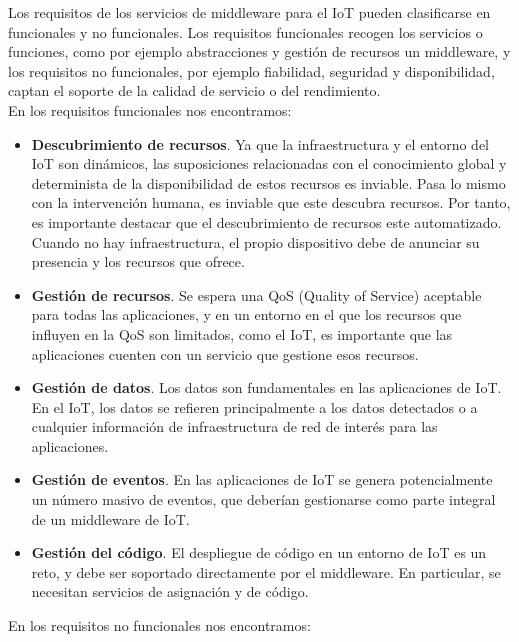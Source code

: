 { Los requisitos de los servicios de middleware para el IoT pueden clasificarse en funcionales y no funcionales. Los requisitos funcionales recogen los servicios o funciones, como por ejemplo abstracciones y gestión de recursos un middleware, y los requisitos no funcionales, por ejemplo fiabilidad, seguridad y disponibilidad, captan el soporte de la calidad de servicio o del rendimiento.\\
 
 En los requisitos funcionales nos encontramos:
 
 \begin{itemize}
     \item \textbf{Descubrimiento de recursos}. Ya que la infraestructura y el entorno del IoT son dinámicos, las suposiciones relacionadas con el conocimiento global y determinista de la disponibilidad de estos recursos es inviable. Pasa lo mismo con la intervención humana, es inviable que este descubra recursos. Por tanto, es importante destacar que el descubrimiento de recursos este automatizado. Cuando no hay infraestructura, el propio dispositivo debe de anunciar su presencia y los recursos que ofrece.
     \item \textbf{Gestión de recursos}. Se espera una QoS (Quality of Service) aceptable para todas las aplicaciones, y en un entorno en el que los recursos que influyen en la QoS son limitados, como el IoT, es importante que las aplicaciones cuenten con un servicio que gestione esos recursos.
     \item \textbf{Gestión de datos}. Los datos son fundamentales en las aplicaciones de IoT. En el IoT, los datos se refieren principalmente a los datos detectados o a cualquier información de infraestructura de red de interés para las aplicaciones.
     \item \textbf{Gestión de eventos}. En las aplicaciones de IoT se genera potencialmente un número masivo de eventos, que deberían gestionarse como parte integral de un middleware de IoT.
     \item \textbf{Gestión del código}. El despliegue de código en un entorno de IoT es un reto, y debe ser soportado directamente por el middleware. En particular, se necesitan servicios de asignación y de código.
 \end{itemize}
 
 En los requisitos no funcionales nos encontramos:
 
}
